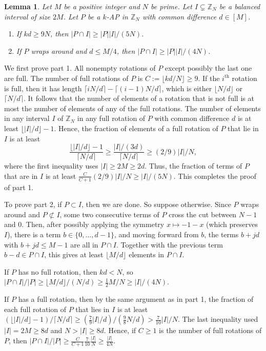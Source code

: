 \documentclass[11pt]{article}
\makeatletter
\numberwithin{equation}{section}
\renewenvironment{proof}[1][\proofname]{\par
  \vspace{-\topsep}%
  \pushQED{\qed}%
  \normalfont
  \topsep0pt \partopsep0pt %
  \trivlist
  \item[\hskip\labelsep
        \itshape
    #1\@addpunct{.}]\ignorespaces
}{%
  \popQED\endtrivlist\@endpefalse
  \addvspace{6pt plus 6pt} %
}
\newtheorem{lem}[result]{Lemma}
\theoremstyle{definition}
\theoremstyle{remark}
\makeatother
\begin{document}
\begin{lem}\label{simplemma3} Let $M$ be a positive integer and $N$ be prime. Let $I \subsetneq \mathbb{Z}_N$ be a balanced interval of size $2M$.  
Let $P$ be a $k$-AP in $\mathbb{Z}_N$ with common difference $d \in [M]$. \begin{enumerate} 
\item If $kd \geq 9N$, then $|P \cap I| \geq |P||I|/(5N)$. 
\item If $P$ wraps around and $d \leq M/4$, then $|P \cap I| \geq |P||I|/(4N)$. 
\end{enumerate}
\end{lem}
\begin{proof}

We first prove part 1. All nonempty rotations of $P$ except possibly the last one are full. The number of full rotations of $P$ is $C:=\lfloor kd/N \rfloor \geq 9$. If the $i^{\textrm{th}}$ rotation is full, then it has length $\lceil iN/d \rceil - \lceil (i-1)N/d \rceil$, which is either $\lfloor N/d \rfloor$ or $\lceil N/d \rceil$. It follows that the number of elements of a rotation that is not full is at most the number of elements of any of the full rotations. The number of elements in any interval $I$ of $\mathbb{Z}_N$ in any full rotation of $P$ with common difference $d$ is at least $\lfloor |I|/d \rfloor-1$. Hence, the fraction of elements of a full rotation of $P$ that lie in $I$ is at least $$\frac{\lfloor |I|/d \rfloor-1}{\lceil N/d \rceil} \geq \frac{|I|/(3d)}{\lceil N/d \rceil} \geq (2/9)|I|/N,$$ where the first inequality uses $|I| \geq 2M \geq 2d$. Thus, the fraction of terms of $P$ that are in $I$ is at least $\frac{C}{C+1}(2/9)|I|/N \geq |I|/(5N)$. This completes the proof of part 1.

To prove part 2, if $P \subset I$, then we are done. So suppose otherwise. Since $P$ wraps around and $P \not \subset I$, some two consecutive terms of $P$ cross the cut between $N-1$ and $0$. Then, after possibly applying the symmetry $x \mapsto -1-x$ (which preserves $I$), there is a term $b \in \{0,\ldots,d-1\}$, and moving forward from $b$, the terms $b+jd$ with $b+jd \leq M-1$ are all in $P \cap I$. Together with the previous term $b-d \in P \cap I$, this gives at least $\lfloor M/d \rfloor$ elements in $P \cap I$. 

If $P$ has no full rotation, then $kd<N$, so $|P \cap I|/|P| \geq \lfloor M/d \rfloor/(N/d) \geq \frac{1}{2}M/N \geq |I|/(4N)$. 

If $P$ has a full rotation, then by the same argument as in part 1, the fraction of each full rotation of $P$ that lies in $I$ is at least $(\lfloor |I|/d \rfloor -1)/\lceil N/d \rceil \geq (\frac{7}{9}|I|/d)/(\frac{9}{8}N/d) > \frac{7}{10}|I|/N$. The last inequality used $|I| =2M \geq 8d$ and $N>|I| \geq 8d$. Hence, if $C \geq 1$ is the number of full rotations of $P$, then $|P \cap I|/|P| \geq \frac{C}{C+1}\frac{7}{10}\frac{|I|}{N} \geq \frac{|I|}{4N}$.
\end{proof}
\end{document}

